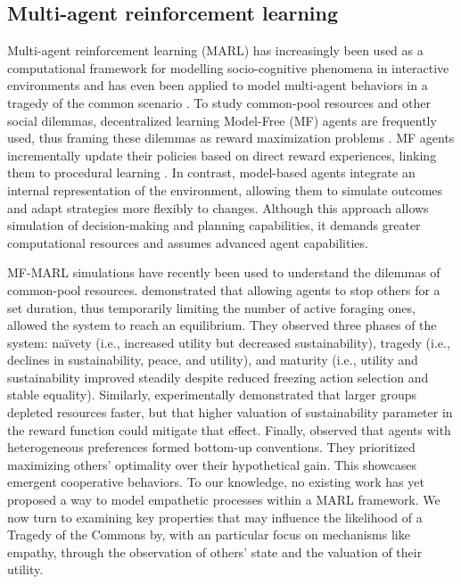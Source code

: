 \subsection{Multi-agent reinforcement learning}
Multi-agent reinforcement learning (MARL) has increasingly been used as a computational framework for modelling socio-cognitive phenomena in interactive environments \cite{gronauerMultiagentDeepReinforcement2022} and has even been applied to model multi-agent behaviors in a tragedy of the common scenario \cite{perolatMultiagentReinforcementLearning2017}.
 To study common-pool resources and other social dilemmas, decentralized learning Model-Free (MF) agents are frequently used, thus framing these dilemmas as reward maximization problems \cite{perolatMultiagentReinforcementLearning2017,wangEvolvingIntrinsicMotivations2018,zhuDeepMultiagentReinforcement2019}. 
 MF agents incrementally update their policies based on direct reward experiences, linking them to procedural learning \cite{kosterModelfreeConventionsMultiagent2020,massiModelbasedModelfreeReplay2022}. In contrast, model-based agents integrate an internal representation of the environment, allowing them to simulate outcomes and adapt strategies more flexibly to changes. Although this approach allows simulation of decision-making and planning capabilities, it demands greater computational resources and assumes advanced agent capabilities\cite{massiModelbasedModelfreeReplay2022}.

MF-MARL simulations have recently been used to understand the dilemmas of common-pool resources. \cite{perolatMultiagentReinforcementLearning2017} demonstrated that allowing agents to stop others for a set duration, thus temporarily limiting the number of active foraging ones, allowed the system to reach an equilibrium. They observed three phases of the system: naïvety (i.e., increased utility but decreased sustainability), tragedy (i.e., declines in sustainability, peace, and utility), and maturity (i.e., utility and sustainability improved steadily despite reduced freezing action selection and stable equality). Similarly, \cite{zhuDeepMultiagentReinforcement2019} experimentally demonstrated that larger groups depleted resources faster, but that higher valuation of sustainability parameter in the reward function could mitigate that effect. Finally, \cite{kosterModelfreeConventionsMultiagent2020} observed that agents with heterogeneous preferences formed bottom-up conventions. They prioritized maximizing others’ optimality over their hypothetical gain. This showcases emergent cooperative behaviors. To our knowledge, no existing work has yet proposed a way to model empathetic processes within a MARL framework. We now turn to examining key properties that may influence the likelihood of a Tragedy of the Commons by, with an particular focus on mechanisms like empathy, through the observation of others' state and the valuation of their utility.

